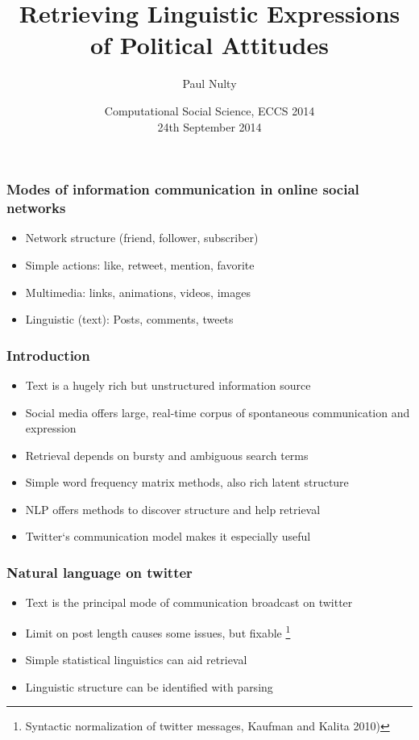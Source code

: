 \documentclass[11pt, table, dvipsnames]{beamer}
\title[Retrieving and Parsing Linguistic Expressions of Political Attitudes]{Retrieving Linguistic Expressions of Political Attitudes}
\author{Paul Nulty}
\institute %
{
  Department of Methodology, \\
  London School of Economics and Political Science, \\
  \vspace{2 mm}
  \textit{QUANTESS} ERC Project 
}
\date %
{Computational Social Science, ECCS 2014 \\ 
24th September 2014}
\begin{document}
\begin{frame}%
\titlepage
\end{frame}


\begin{frame}
  \frametitle{Modes of information communication in online social networks}
 \begin{itemize}
  \item Network structure (friend, follower, subscriber)
  \item Simple actions: like, retweet, mention, favorite
  \item Multimedia: links, animations, videos, images
  \item Linguistic (text): Posts, comments, tweets
  \end{itemize}
\end{frame}

\begin{frame}
  \frametitle{Introduction}
  \begin{itemize}
  \item Text is a hugely rich but unstructured information source
  \item Social media offers large, real-time corpus of spontaneous communication and expression
  \item Retrieval depends on bursty and ambiguous search terms
  \item Simple word frequency matrix methods, also rich latent structure
  \item NLP offers methods to discover structure and help retrieval
  \item Twitter`s communication model makes it especially useful
  \end{itemize}
\end{frame}

\begin{frame}
  \frametitle{Natural language on twitter}
  \begin{itemize}
  \item Text is the principal mode of communication broadcast on twitter
  \item Limit on post length causes some issues, but fixable \footnote{Syntactic normalization of twitter messages, Kaufman and Kalita 2010)}
  \item Simple statistical linguistics can aid retrieval
  \item Linguistic structure can be identified with parsing
  \end{itemize}
\end{frame}
\end{document}

